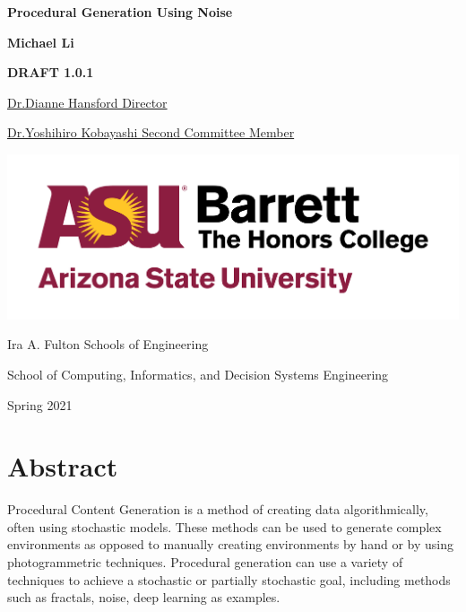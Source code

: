\documentclass[10pt]{report}
\begin{document}
	\begin{titlepage}
		\begin{center}
			\Large
			\textbf{Procedural Generation Using Noise}
			
			\vspace{1.5cm}
			\normalsize
			\textbf{Michael Li}
			
			\vfill
			
			\textbf{DRAFT 1.0.1}
			
			\uline{Dr.Dianne Hansford \hfill Director}
			\vspace{1.5cm}
			
			\uline{Dr.Yoshihiro Kobayashi \hfill Second Committee Member}
			
			\vspace{3cm}
			
			\includegraphics[scale=.5]{asu_barretthonors_horiz_rgb_maroongold_600ppi}
			
			\vspace{1.5cm}
			Ira A. Fulton Schools of Engineering
			
			School of Computing, Informatics, and Decision Systems Engineering
			
			Spring 2021
			
		\end{center}
	\end{titlepage}
	
	\chapter*{Abstract}
	
	Procedural Content Generation is a method of creating data algorithmically, often using stochastic models. These methods can be used to generate complex environments as opposed to manually creating environments by hand or by using photogrammetric techniques. Procedural generation can use a variety of techniques to achieve a stochastic or partially stochastic goal, including methods such as fractals,  noise, deep learning as examples.
	
\end{document}
